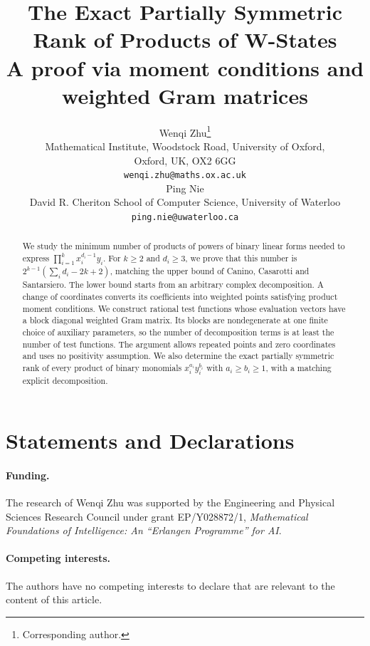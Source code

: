 \documentclass[10pt,a4paper]{article}
\title{The Exact Partially Symmetric Rank of Products of W-States\\[2pt]\large A proof via moment conditions and weighted Gram matrices}
\author{%
Wenqi Zhu\thanks{Corresponding author.}\\
{\small Mathematical Institute, Woodstock Road, University of Oxford,}\\
{\small Oxford, UK, OX2 6GG}\\
{\small\texttt{wenqi.zhu@maths.ox.ac.uk}}\\[1ex]
Ping Nie\\
{\small David R. Cheriton School of Computer Science, University of Waterloo}\\
{\small\texttt{ping.nie@uwaterloo.ca}}}
\date{}
\theoremstyle{definition}
\renewcommand{\baselinestretch}{1.15}
\begin{document}
\maketitle
\begin{abstract}
We study the minimum number of products of powers of binary linear forms
needed to express $\prod_{i=1}^k x_i^{d_i-1}y_i$.
For $k\ge2$ and $d_i\ge3$, we prove that this number is
$2^{k-1}(\sum_i d_i-2k+2)$, matching the upper bound of
Canino, Casarotti and Santarsiero. The lower bound starts from an arbitrary
complex decomposition. A change of coordinates converts its coefficients
into weighted points satisfying product moment conditions. We construct
rational test functions whose evaluation vectors have a block diagonal
weighted Gram matrix. Its blocks are nondegenerate at one finite
choice of auxiliary parameters, so the number of decomposition terms is
at least the number of test functions. The argument allows repeated points
and zero coordinates and uses no positivity assumption.
We also determine the exact partially symmetric rank of every product of
binary monomials $x_i^{a_i}y_i^{b_i}$ with $a_i\ge b_i\ge1$, with a
matching explicit decomposition.
\end{abstract}









\appendix
\normalsize\renewcommand{\baselinestretch}{1.15}\selectfont
\setlength{\abovedisplayskip}{4pt plus 2pt minus 2pt}
\setlength{\belowdisplayskip}{4pt plus 2pt minus 2pt}
\setlength{\abovedisplayshortskip}{0pt plus 2pt}
\setlength{\belowdisplayshortskip}{3pt plus 2pt minus 1pt}


\section*{Statements and Declarations}
\paragraph{Funding.}
The research of Wenqi Zhu was supported by the Engineering and Physical
Sciences Research Council under grant EP/Y028872/1, \emph{Mathematical
Foundations of Intelligence: An ``Erlangen Programme'' for AI}.

\paragraph{Competing interests.}
The authors have no competing interests to declare that are relevant to
the content of this article.
\end{document}
